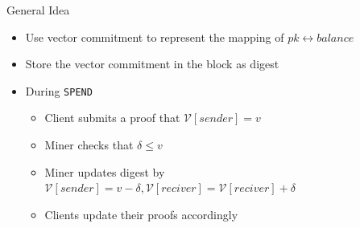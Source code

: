 \documentclass[biblatex,aspectratio=169,11pt]{mybeamer}
\begin{document}
\begin{frame}{General Idea}
  \begin{itemize}
    \item Use vector commitment to represent the mapping of $pk \leftrightarrow balance$
    \item Store the vector commitment in the block as digest
    \item During \texttt{SPEND}
      \begin{itemize}
        \item Client submits a proof that $\mathcal{V}[sender] = v$
        \item Miner checks that $\delta \leq v$
        \item Miner updates digest by $\mathcal{V}[sender] = v - \delta, \mathcal{V}[reciver] = \mathcal{V}[reciver] + \delta$
        \item Clients update their proofs accordingly
      \end{itemize}
  \end{itemize}
\end{frame}

\nocite{*}
\PrintRef%
\PrintQA%
\end{document}
